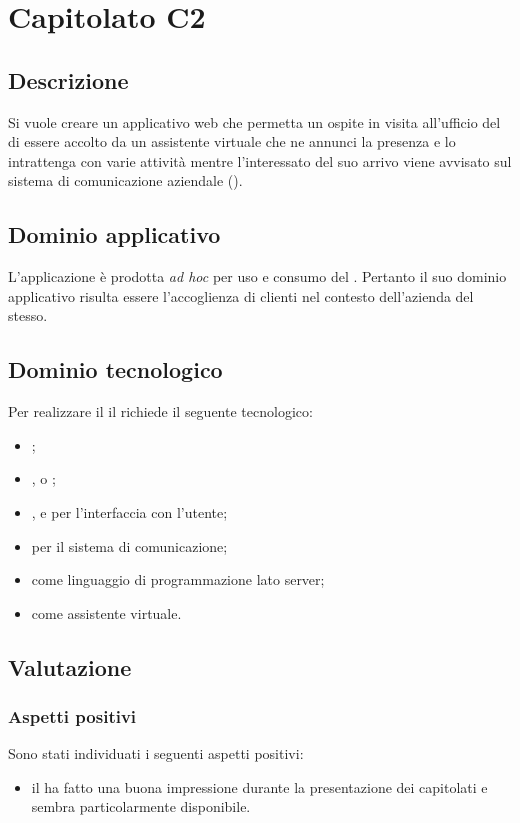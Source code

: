 \documentclass[../StudioDiFattibilita.tex]{subfiles}
\begin{document}
	\section{Capitolato C2}
		\subsection{Descrizione}
			Si vuole creare un applicativo web che permetta un ospite in visita all'ufficio del  di essere accolto da un assistente virtuale che ne annunci la presenza e lo intrattenga con varie attività mentre l'interessato del suo arrivo viene avvisato sul sistema di comunicazione aziendale ().
		\subsection{Dominio applicativo}
			L'applicazione è prodotta \textit{ad hoc} per uso e consumo del . Pertanto il suo dominio applicativo risulta essere l'accoglienza di clienti nel contesto dell'azienda del  stesso.
		\subsection{Dominio tecnologico}
			Per realizzare il  il  richiede il seguente  tecnologico:
		\begin{itemize}
			\item \textbf{}; 
			\item \textbf{}, \textbf{} o \textbf{};
			\item \textbf{}, \textbf{} e \textbf{} per l'interfaccia con l'utente;
			\item \textbf{} per il sistema di comunicazione;
			\item \textbf{} \textbf{} come linguaggio di programmazione lato server;
			\item \textbf{} \textbf{} come assistente virtuale.
		\end{itemize}
		\subsection{Valutazione}
			\subsubsection{Aspetti positivi}
			Sono stati individuati i seguenti aspetti positivi:
			\begin{itemize}
				\item il  ha fatto una buona impressione durante la presentazione dei capitolati e sembra particolarmente disponibile.
			\end{itemize}
\end{document}
